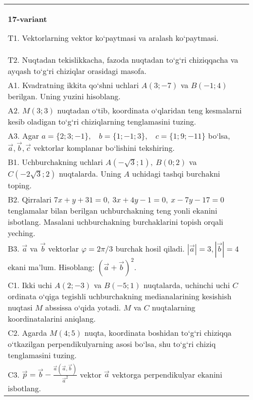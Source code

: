 \documentclass{article}
\begin{document}
\begin{tabular}{m{17cm}}
\textbf{17-variant}
\newline

T1. 
Vektorlarning vektor ko‘paytmasi va aralash ko‘paytmasi.
 \\
T2. 
Nuqtadan tekislikkacha, fazoda nuqtadan to‘g‘ri chiziqqacha va ayqash to‘g‘ri chiziqlar orasidagi masofa. \\
A1. 
Kvadratning ikkita qo‘shni uchlari $A (3; -7)$ va
$B (-1;4) $ berilgan. Uning yuzini hisoblang.
 \\
A2. 
$M (3;3)$ nuqtadan o‘tib, koordinata o‘qlaridan teng
kesmalarni kesib oladigan to‘g‘ri chiziqlarning tenglamasini tuzing.
 \\
A3. 
Agar \(a = \{ 2;3; - 1\}, \ \ \ \ b = \{ 1; - 1;3\}, \ \ \ \ c = \{ 1;9; - 11\}\) bo‘lsa, $\overrightarrow{a}, \overrightarrow{b}, \overrightarrow{c}$ vektorlar komplanar bo‘lishini tekshiring.
 \\
B1. 
Uchburchakning uchlari
\(A\left(-\sqrt{3};1 \right),\ B (0;2) \) va
\(C\left(-2\sqrt{3};2 \right) \) nuqtalarda. Uning $A$
uchidagi tashqi burchakni toping.
 \\
B2. 
Qirralari
\(7x+y+31=0,\ 3x+4y-1=0,\ x-7y-17=0\) tenglamalar
bilan berilgan uchburchakning teng yonli ekanini isbotlang.
Masalani uchburchakning
burchaklarini topish orqali yeching.
 \\
B3. 
$\vec{a}$ va $\vec{b}$ vektorlar $\varphi = 2\pi/3$ burchak hosil qiladi. $|\vec{a}| = 3,|\vec{b}| = 4$ ekani ma’lum. Hisoblang:
$ (\vec{a} + \vec{b}) ^{2}$.
 \\
C1. 
Ikki uchi \(A (2; - 3) \) va \(B (-5;1) \) nuqtalarda,
uchinchi uchi $C$ ordinata o‘qiga tegishli uchburchakning
medianalarining kesishish nuqtasi $M$ abssissa o‘qida yotadi.
$M$ va $C$ nuqtalarning koordinatalarini aniqlang.
 \\
C2. 
Agarda \(M (4;5) \) nuqta, koordinata boshidan to‘g‘ri chiziqqa
o‘tkazilgan perpendikulyarning asosi bo‘lsa, shu to‘g‘ri chiziq tenglamasini
tuzing.
 \\
C3. 
\(\vec{p} = \vec{b} - \frac{\vec{a} (\vec{a},\vec{b}) }{{\vec{a}}^{2}}\) vektor \(\vec{a}\) vektorga perpendikulyar ekanini isbotlang.
 \\

\end{tabular}
\vspace{1cm}
\end{document}
